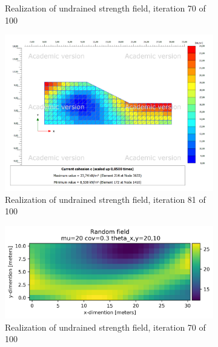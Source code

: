 \begin{figure}
\begin{subfigure}{0.475\textwidth}
    \caption[]%
    {{\small Realization of undrained strength field, iteration 70 of 100}}
    \label{fig:mean and std of net34}
\end{subfigure}
\hfill
\begin{subfigure}{0.475\textwidth}
    \centering
    \includegraphics[width=\textwidth]{fig/ss/testp20211118-125818}
    \caption[]%
    {{\small Realization of undrained strength field, iteration 81 of 100}}
    \label{fig:mean and std of net44}
\end{subfigure}
\begin{subfigure}{0.475\textwidth}
    \centering
    \includegraphics[width=\textwidth]{fig/ss/test20211118-125941}
    \caption[]%
    {{\small Realization of undrained strength field, iteration 70 of 100}}
    \label{fig:mean and std of net56}
\end{subfigure}
\hfill
\begin{subfigure}{0.475\textwidth}
    \centering

\end{subfigure}
\end{figure}
